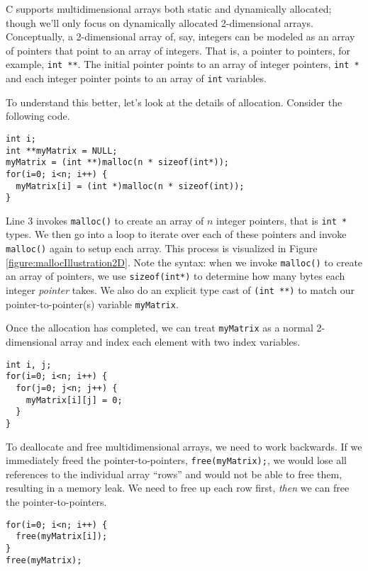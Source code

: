 C supports multidimensional arrays both static and dynamically
allocated; though we'll only focus on dynamically allocated 2-dimensional
arrays.  Conceptually, a 2-dimensional array of, say, integers can
be modeled as an array of pointers that point to an array of integers.
That is, a pointer to pointers, for example, \texttt{int **}.  
The initial pointer points to an array of integer pointers, \texttt{int *}
and each integer pointer points to an array of \texttt{int} variables.

To understand this better, let's look at the details of allocation.  Consider
the following code.

\begin{verbatim}
int i;
int **myMatrix = NULL; 
myMatrix = (int **)malloc(n * sizeof(int*)); 
for(i=0; i<n; i++) {
  myMatrix[i] = (int *)malloc(n * sizeof(int)); 
}
\end{verbatim}

Line 3 invokes \texttt{malloc()} to create an array of $n$ integer
pointers, that is \texttt{int *} types.  We then go into a loop to
iterate over each of these pointers and invoke \texttt{malloc()} 
again to setup each array.  This process is visualized in Figure 
\ref{figure:mallocIllustration2D}.  Note the syntax: when we invoke \texttt{malloc()} to 
create an array of pointers, we use \texttt{sizeof(int*)} to
determine how many bytes each integer \emph{pointer} takes.  We
also do an explicit type cast of \texttt{(int **)} to match our
pointer-to-pointer(s) variable \texttt{myMatrix}.  



Once the allocation has completed, we can treat \texttt{myMatrix}
as a normal 2-dimensional array and index each element with two
index variables.

\begin{verbatim}
int i, j;
for(i=0; i<n; i++) {
  for(j=0; j<n; j++) {
    myMatrix[i][j] = 0;
  }
}
\end{verbatim}

To deallocate and free multidimensional arrays, we need to work backwards.
If we immediately freed the pointer-to-pointers, \texttt{free(myMatrix);}, 
we would lose all references to the individual array ``rows'' and would not
be able to free them, resulting in a \gls{memory leak}.  We need to free up 
each row first, \emph{then} we can free the pointer-to-pointers.

\begin{verbatim}
for(i=0; i<n; i++) {
  free(myMatrix[i]);
}
free(myMatrix);
\end{verbatim}

